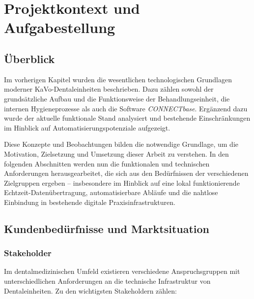 \chapter{Projektkontext und Aufgabestellung}
\label{chap:projektkontext}
\section{Überblick}

Im vorherigen Kapitel wurden die wesentlichen technologischen Grundlagen moderner KaVo-Dentaleinheiten beschrieben. Dazu zählen sowohl der grundsätzliche Aufbau und die Funktionsweise der Behandlungseinheit, die internen Hygieneprozesse als auch die Software \textit{CONNECTbase}. Ergänzend dazu wurde der aktuelle funktionale Stand analysiert und bestehende Einschränkungen im Hinblick auf Automatisierungspotenziale aufgezeigt.

Diese Konzepte und Beobachtungen bilden die notwendige Grundlage, um die Motivation, Zielsetzung und Umsetzung dieser Arbeit zu verstehen. In den folgenden Abschnitten werden nun die funktionalen und technischen Anforderungen herausgearbeitet, die sich aus den Bedürfnissen der verschiedenen Zielgruppen ergeben – insbesondere im Hinblick auf eine lokal funktionierende Echtzeit-Datenübertragung, automatisierbare Abläufe und die nahtlose Einbindung in bestehende digitale Praxisinfrastrukturen.


\section{Kundenbedürfnisse und Marktsituation}
\subsection{Stakeholder}

Im dentalmedizinischen Umfeld existieren verschiedene Anspruchsgruppen mit unterschiedlichen Anforderungen an die technische Infrastruktur von Dentaleinheiten. Zu den wichtigsten Stakeholdern zählen:


